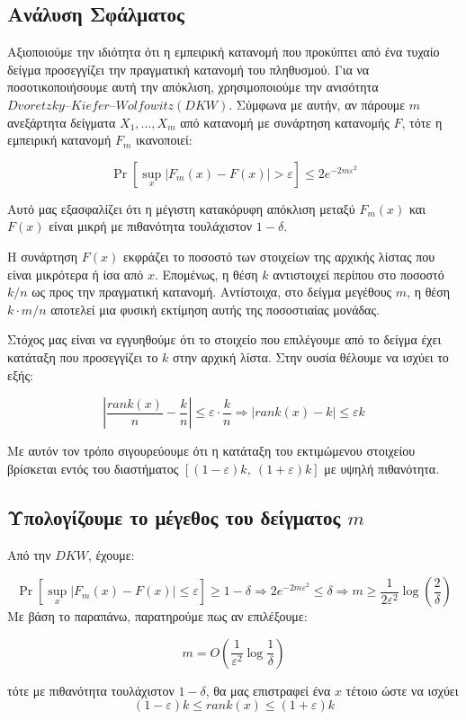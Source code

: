 \documentclass[12pt]{article}
\begin{document}
\subsection*{Ανάλυση Σφάλματος}

Αξιοποιούμε την ιδιότητα ότι η εμπειρική κατανομή που προκύπτει από ένα τυχαίο δείγμα προσεγγίζει την πραγματική κατανομή του πληθυσμού. Για να ποσοτικοποιήσουμε αυτή την απόκλιση, χρησιμοποιούμε την ανισότητα \textbf{$Dvoretzky–Kiefer–Wolfowitz (DKW)$}. Σύμφωνα με αυτήν, αν πάρουμε $m$ ανεξάρτητα δείγματα $X_1, \dots, X_m$ από κατανομή με συνάρτηση κατανομής $F$, τότε η εμπειρική κατανομή $F_m$ ικανοποιεί:

\[
\Pr\left[\sup_{x} |F_m(x) - F(x)| > \varepsilon\right] \leq 2 e^{-2 m \varepsilon^2}
\]

Αυτό μας εξασφαλίζει ότι η μέγιστη κατακόρυφη απόκλιση μεταξύ $F_m(x)$ και $F(x)$ είναι μικρή με πιθανότητα τουλάχιστον $1 - \delta$.

Η συνάρτηση $F(x)$ εκφράζει το ποσοστό των στοιχείων της αρχικής λίστας που είναι μικρότερα ή ίσα από $x$. Επομένως, η θέση $k$ αντιστοιχεί περίπου στο ποσοστό $k/n$ ως προς την πραγματική κατανομή. Αντίστοιχα, στο δείγμα μεγέθους $m$, η θέση $k \cdot m / n$ αποτελεί μια φυσική εκτίμηση αυτής της ποσοστιαίας μονάδας.

Στόχος μας είναι να εγγυηθούμε ότι το στοιχείο που επιλέγουμε από το δείγμα έχει κατάταξη που προσεγγίζει το $k$ στην αρχική λίστα. Στην ουσία θέλουμε να ισχύει το εξής:

\[
\left| \frac{\text{$rank$}(x)}{n} - \frac{k}{n} \right| \leq \varepsilon \cdot \frac{k}{n}
\Rightarrow
\left| \text{$rank$}(x) - k \right| \leq \varepsilon k
\]

Με αυτόν τον τρόπο σιγουρεύουμε ότι η κατάταξη του εκτιμώμενου στοιχείου βρίσκεται εντός του διαστήματος $[(1 - \varepsilon)k,\ (1 + \varepsilon)k]$ με υψηλή πιθανότητα.
\subsection*{Υπολογίζουμε το μέγεθος του δείγματος $m$}

Από την $DKW$, έχουμε:

\[
\Pr\left[\sup_{x} |F_m(x) - F(x)| \leq \varepsilon\right] \geq 1 - \delta
\Rightarrow
2 e^{-2 m \varepsilon^2} \leq \delta
\Rightarrow
m \geq \frac{1}{2 \varepsilon^2} \log \left(\frac{2}{\delta}\right)
\]
Με βάση το παραπάνω, παρατηρούμε πως αν επιλέξουμε:

\[
m = O\left(\frac{1}{\varepsilon^2} \log \frac{1}{\delta} \right)
\]

τότε με πιθανότητα τουλάχιστον $1 - \delta$, θα μας επιστραφεί ένα $x$ τέτοιο ώστε να ισχύει
\[
(1 - \varepsilon)k \leq \text{$rank$}(x) \leq (1 + \varepsilon)k
\]
\end{document}
